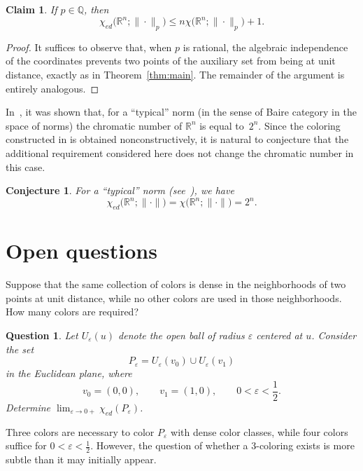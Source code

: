 \documentclass[12pt,a4paper]{article}
\newtheorem{claim}{Claim}
\newtheorem{question}{Question}
\newtheorem{conjecture}{Conjecture}
\begin{document}
\begin{claim}
If $p\in\mathbb{Q}$, then
\[
    \chi_{ed}\bigl(\mathbb{R}^n;\|\cdot\|_p\bigr)
    \leq n\chi\bigl(\mathbb{R}^n;\|\cdot\|_p\bigr)+1.
\]
\end{claim}

\begin{proof}
It suffices to observe that, when $p$ is rational, the algebraic
independence of the coordinates prevents two points of the auxiliary set
from being at unit distance, exactly as in Theorem~\ref{thm:main}. The
remainder of the argument is entirely analogous.
\end{proof}

In~\cite{alon2025unit}, it was shown that, for a ``typical'' norm (in the
sense of Baire category in the space of norms) the chromatic number of
$\mathbb{R}^n$ is equal to~$2^n$. Since the coloring constructed in
\cite{alon2025unit} is obtained nonconstructively, it is natural to
conjecture that the additional requirement considered here does not change
the chromatic number in this case.

\begin{conjecture}
For a ``typical'' norm (see~\cite{alon2025unit}), we have
\[
    \chi_{ed}\bigl(\mathbb{R}^n;\|\cdot\|\bigr)
    =
    \chi\bigl(\mathbb{R}^n;\|\cdot\|\bigr)
    =
    2^n.
\]
\end{conjecture}

\section{Open questions}

 Suppose that the same collection of
colors is dense in the neighborhoods of two points at unit distance, while
no other colors are used in those neighborhoods. How many colors are
required?

\begin{question}
Let \(U_\varepsilon(u)\) denote the open ball of radius \(\varepsilon\)
centered at \(u\). Consider the set
\[
P_\varepsilon=U_\varepsilon(v_0)\cup U_\varepsilon(v_1)
\]
in the Euclidean plane, where
\[
v_0=(0,0),\qquad v_1=(1,0),\qquad 0<\varepsilon<\frac12.
\]
Determine \(\lim_{\varepsilon \to 0+} \chi_{ed}(P_\varepsilon)\).
\end{question}

Three colors are necessary to color \(P_\varepsilon\) with  dense
color classes, while four colors suffice for $0 < \varepsilon < \frac{1}{2}$. However, the question of whether a
3-coloring exists is more subtle than it may initially appear.
\end{document}
